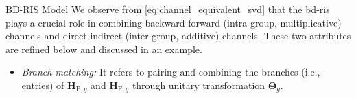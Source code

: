 \begin{section}{BD-RIS Model}
	We observe from \eqref{eq:channel_equivalent_svd} that the \gls{bd}-\gls{ris} plays a crucial role in combining
	backward-forward (intra-group, multiplicative) channels and direct-indirect (inter-group, additive) channels.
	These two attributes are refined below and discussed in an example.
	\begin{itemize}
		\item \emph{Branch matching:} It refers to pairing and combining the branches (i.e., entries) of $\mathbf{H}_{\mathrm{B},g}$ and $\mathbf{H}_{\mathrm{F},g}$ through unitary transformation $\mathbf{\Theta}_g$.

\end{itemize}
\end{section}
